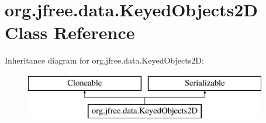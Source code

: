 \hypertarget{classorg_1_1jfree_1_1data_1_1_keyed_objects2_d}{}\section{org.\+jfree.\+data.\+Keyed\+Objects2D Class Reference}
\label{classorg_1_1jfree_1_1data_1_1_keyed_objects2_d}
Inheritance diagram for org.\+jfree.\+data.\+Keyed\+Objects2D\+:\begin{figure}[H]
\begin{center}
\leavevmode
\includegraphics[height=2.000000cm]{classorg_1_1jfree_1_1data_1_1_keyed_objects2_d}
\end{center}
\end{figure}
